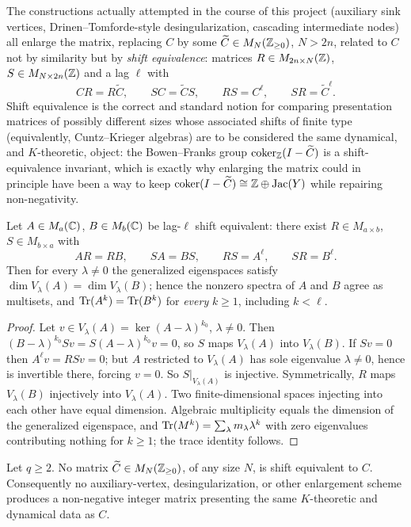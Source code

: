 The constructions actually attempted in the course of this project (auxiliary sink
vertices, Drinen--Tomforde-style desingularization, cascading intermediate nodes) all
enlarge the matrix, replacing $C$ by some $\widetilde C\in M_N(\mathbb{Z}_{\ge0})$, $N>2n$,
related to $C$ not by similarity but by \emph{shift equivalence}: matrices $R\in
M_{2n\times N}(\mathbb{Z})$, $S\in M_{N\times2n}(\mathbb{Z})$ and a lag $\ell$ with
\[
CR=R\widetilde C,\qquad SC=\widetilde CS,\qquad RS=C^\ell,\qquad SR=\widetilde C^\ell.
\]
Shift equivalence is the correct and standard notion for comparing presentation
matrices of possibly different sizes whose associated shifts of finite type (equivalently,
Cuntz--Krieger algebras) are to be considered the same dynamical, and $K$-theoretic,
object: the Bowen--Franks group $\operatorname{coker}_{\mathbb{Z}}(I-\widetilde C)$ is a shift-equivalence
invariant, which is exactly why enlarging the matrix could in principle have been a way
to keep $\operatorname{coker}(I-\widetilde C)\cong\mathbb{Z}\oplus\operatorname{Jac}(Y)$ while repairing non-negativity.

\begin{lemma}\label{II:lem:se}
Let $A\in M_a(\mathbb{C})$, $B\in M_b(\mathbb{C})$ be lag-$\ell$ shift equivalent: there exist
$R\in M_{a\times b}$, $S\in M_{b\times a}$ with
\[
AR=RB,\qquad SA=BS,\qquad RS=A^\ell,\qquad SR=B^\ell .
\]
Then for every $\lambda\neq0$ the generalized eigenspaces satisfy
$\dim V_\lambda(A)=\dim V_\lambda(B)$; hence the nonzero spectra of $A$ and $B$ agree as
multisets, and $\operatorname{Tr}(A^k)=\operatorname{Tr}(B^k)$ for \emph{every} $k\ge1$, including $k<\ell$.
\end{lemma}

\begin{proof}
Let $v\in V_\lambda(A)=\ker(A-\lambda)^{k_0}$, $\lambda\neq0$. Then
$(B-\lambda)^{k_0}Sv=S(A-\lambda)^{k_0}v=0$, so $S$ maps $V_\lambda(A)$ into
$V_\lambda(B)$. If $Sv=0$ then $A^\ell v=RSv=0$; but $A$ restricted to $V_\lambda(A)$
has sole eigenvalue $\lambda\neq0$, hence is invertible there, forcing $v=0$. So
$S|_{V_\lambda(A)}$ is injective. Symmetrically, $R$ maps $V_\lambda(B)$ injectively
into $V_\lambda(A)$. Two finite-dimensional spaces injecting into each other have equal
dimension. Algebraic multiplicity equals the dimension of the generalized eigenspace,
and $\operatorname{Tr}(M^k)=\sum_\lambda m_\lambda\lambda^k$ with zero eigenvalues contributing
nothing for $k\ge1$; the trace identity follows.
\end{proof}

\begin{theorem}\label{II:thm:traceany}
Let $q\ge2$. No matrix $\widetilde C\in M_N(\mathbb{Z}_{\ge0})$, of any size $N$, is shift
equivalent to $C$. Consequently no auxiliary-vertex, desingularization, or other
enlargement scheme produces a non-negative integer matrix presenting the same
$K$-theoretic and dynamical data as $C$.
\end{theorem}

